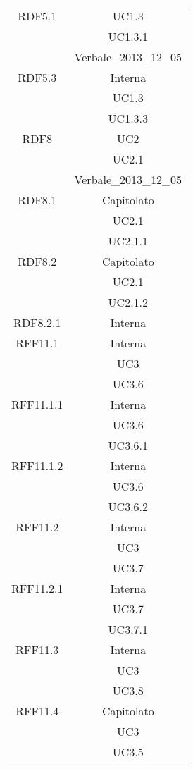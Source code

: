 \begin{longtable}{|c|c|}
\midrule
RDF5.1
& UC1.3\\
& UC1.3.1\\
& Verbale\_2013\_12\_05\\

\midrule
RDF5.3
& Interna\\
& UC1.3\\
& UC1.3.3\\

\midrule
RDF8
& UC2\\
& UC2.1\\
& Verbale\_2013\_12\_05\\

\midrule
RDF8.1
& Capitolato\\
& UC2.1\\
& UC2.1.1\\

\midrule
RDF8.2
& Capitolato\\
& UC2.1\\
& UC2.1.2\\

\midrule
RDF8.2.1
& Interna\\

\midrule
RFF11.1
& Interna\\
& UC3\\
& UC3.6\\

\midrule
RFF11.1.1
& Interna\\
& UC3.6\\
& UC3.6.1\\

\midrule
RFF11.1.2
& Interna\\
& UC3.6\\
& UC3.6.2\\

\midrule
RFF11.2
& Interna\\
& UC3\\
& UC3.7\\

\midrule
RFF11.2.1
& Interna\\
& UC3.7\\
& UC3.7.1\\

\midrule
RFF11.3
& Interna\\
& UC3\\
& UC3.8\\

\midrule
RFF11.4
& Capitolato\\
& UC3\\
& UC3.5\\


\end{longtable}
